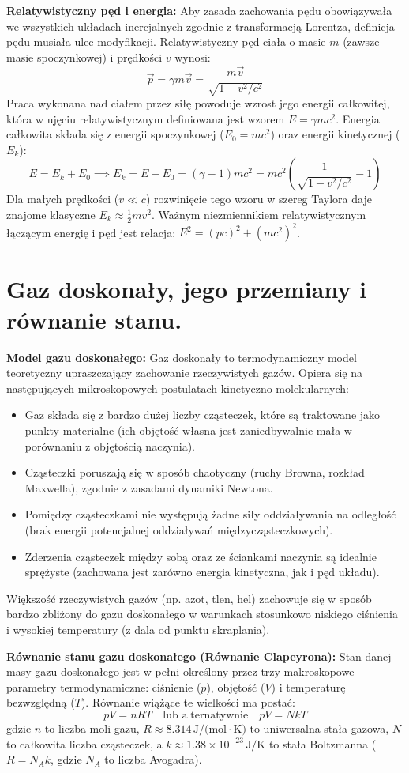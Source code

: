 \documentclass[11pt, a4paper]{article}
\begin{document}
\textbf{Relatywistyczny pęd i energia:}
Aby zasada zachowania pędu obowiązywała we wszystkich układach inercjalnych zgodnie z transformacją Lorentza, definicja pędu musiała ulec modyfikacji. Relatywistyczny pęd ciała o masie $m$ (zawsze masie spoczynkowej) i prędkości $v$ wynosi:
\[
\vec{p} = \gamma m \vec{v} = \frac{m \vec{v}}{\sqrt{1 - v^2/c^2}}
\]
Praca wykonana nad ciałem przez siłę powoduje wzrost jego energii całkowitej, która w ujęciu relatywistycznym definiowana jest wzorem $E = \gamma m c^2$. Energia całkowita składa się z energii spoczynkowej ($E_0 = mc^2$) oraz energii kinetycznej ($E_k$):
\[
E = E_k + E_0 \implies E_k = E - E_0 = (\gamma - 1)mc^2 = mc^2 \left(\frac{1}{\sqrt{1 - v^2/c^2}} - 1\right)
\]
Dla małych prędkości ($v \ll c$) rozwinięcie tego wzoru w szereg Taylora daje znajome klasyczne $E_k \approx \frac{1}{2}mv^2$. Ważnym niezmiennikiem relatywistycznym łączącym energię i pęd jest relacja: $E^2 = (pc)^2 + (mc^2)^2$.

\section{Gaz doskonały, jego przemiany i równanie stanu.}

\textbf{Model gazu doskonałego:}
Gaz doskonały to termodynamiczny model teoretyczny upraszczający zachowanie rzeczywistych gazów. Opiera się na następujących mikroskopowych postulatach kinetyczno-molekularnych:
\begin{itemize}
    \item Gaz składa się z bardzo dużej liczby cząsteczek, które są traktowane jako punkty materialne (ich objętość własna jest zaniedbywalnie mała w porównaniu z objętością naczynia).
    \item Cząsteczki poruszają się w sposób chaotyczny (ruchy Browna, rozkład Maxwella), zgodnie z zasadami dynamiki Newtona.
    \item Pomiędzy cząsteczkami nie występują żadne siły oddziaływania na odległość (brak energii potencjalnej oddziaływań międzycząsteczkowych).
    \item Zderzenia cząsteczek między sobą oraz ze ściankami naczynia są idealnie sprężyste (zachowana jest zarówno energia kinetyczna, jak i pęd układu).
\end{itemize}
Większość rzeczywistych gazów (np. azot, tlen, hel) zachowuje się w sposób bardzo zbliżony do gazu doskonałego w warunkach stosunkowo niskiego ciśnienia i wysokiej temperatury (z dala od punktu skraplania).

\textbf{Równanie stanu gazu doskonałego (Równanie Clapeyrona):}
Stan danej masy gazu doskonałego jest w pełni określony przez trzy makroskopowe parametry termodynamiczne: ciśnienie ($p$), objętość ($V$) i temperaturę bezwzględną ($T$). Równanie wiążące te wielkości ma postać:
\[
pV = nRT \quad \text{lub alternatywnie} \quad pV = NkT
\]
gdzie $n$ to liczba moli gazu, $R \approx 8.314 \, \text{J/(mol}\cdot\text{K)}$ to uniwersalna stała gazowa, $N$ to całkowita liczba cząsteczek, a $k \approx 1.38 \times 10^{-23} \, \text{J/K}$ to stała Boltzmanna ($R = N_A k$, gdzie $N_A$ to liczba Avogadra).
\end{document}
